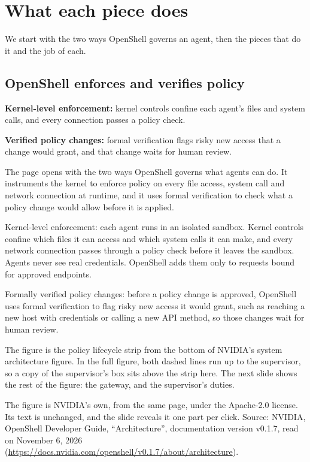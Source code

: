 \section{What each piece does}
\label{sec:row-p1-0}

We start with the two ways OpenShell governs an agent, then the pieces that do it and the job of each.

\subsection{OpenShell enforces and verifies policy}
\label{sec:it-os-1-1}

\bi
\item \textbf{Kernel-level enforcement:} kernel controls confine each agent's files and system calls, and every connection passes a policy check.
\item \textbf{Verified policy changes:} formal verification flags risky new access that a change would grant, and that change waits for human review.
\ei

The page opens with the two ways OpenShell governs what agents can do. It instruments the kernel to enforce policy on every file access, system call and network connection at runtime, and it uses formal verification to check what a policy change would allow before it is applied.

Kernel-level enforcement: each agent runs in an isolated sandbox. Kernel controls confine which files it can access and which system calls it can make, and every network connection passes through a policy check before it leaves the sandbox. Agents never see real credentials. OpenShell adds them only to requests bound for approved endpoints.

Formally verified policy changes: before a policy change is approved, OpenShell uses formal verification to flag risky new access it would grant, such as reaching a new host with credentials or calling a new API method, so those changes wait for human review.

The figure is the policy lifecycle strip from the bottom of NVIDIA's system architecture figure. In the full figure, both dashed lines run up to the supervisor, so a copy of the supervisor's box sits above the strip here. The next slide shows the rest of the figure: the gateway, and the supervisor's duties.

The figure is NVIDIA's own, from the same page, under the Apache-2.0 license. Its text is unchanged, and the slide reveals it one part per click. Source: NVIDIA, OpenShell Developer Guide, ``Architecture'', documentation version v0.1.7, read on November 6, 2026 (\url{https://docs.nvidia.com/openshell/v0.1.7/about/architecture}).

